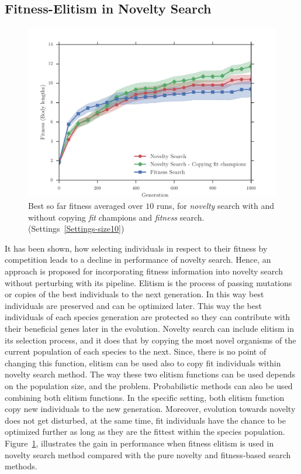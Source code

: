 \subsection*{Fitness-Elitism in Novelty Search}

\begin{figure}[t!]
\centering
\includegraphics[width=1.0\textwidth]{../Figures/Results/CopyFitChampions10.pdf}
\caption{Best so far fitness averaged over $10$ runs, for \emph{novelty} search with and without copying \emph{fit} champions and \emph{fitness} search. (Settings~\ref{Settings-size10})}
\label{fig:CopyFitChampions10}
\end{figure}

It has been shown, how selecting individuals in respect to their fitness by competition leads to a decline in performance of novelty search. Hence, an approach is proposed for incorporating fitness information into novelty search without perturbing with its pipeline. Elitism is the process of passing mutations or copies of the best individuals to the next generation. In this way best individuals are preserved and can be optimized later. This way the best individuals of each species generation are protected so they can contribute with their beneficial genes later in the evolution. Novelty search can include elitism in its selection process, and it does that by copying the most novel organisms of the current population of each species to the next. Since, there is no point of changing this function, elitism can be used also to copy fit individuals within novelty search method. The way these two elitism functions can be used depends on the population size, and the problem. Probabilistic methods can also be used combining both elitism functions. In the specific setting, both elitism function copy new individuals to the new generation. Moreover, evolution towards novelty does not get disturbed, at the same time, fit individuals have the chance to be optimized further as long as they are the fittest within the species population. Figure~\ref{fig:CopyFitChampions10}, illustrates the gain in performance when fitness elitism is used in novelty search method compared with the pure novelty and fitness-based search methods.



